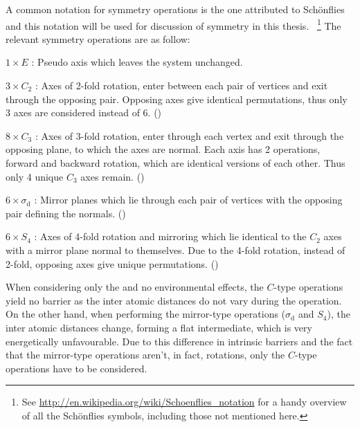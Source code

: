 A common notation for symmetry operations is the one attributed to Sch\"onflies~\cite{schonflies-notation-1889} and this notation will be used for discussion of symmetry in this thesis.
~\footnote{See \url{http://en.wikipedia.org/wiki/Schoenflies_notation} for a handy overview of all the Sch\"onflies symbols, including those not mentioned here.}
The relevant symmetry operations are as follow:
\bit
\item $1 \times E$ : Pseudo axis which leaves the system unchanged.
\item $3 \times C_2$ : Axes of 2-fold rotation, enter between each pair of vertices and exit through the opposing pair.
Opposing axes give identical permutations, thus only 3 axes are considered instead of 6.
()
\item $8 \times C_3$ : Axes of 3-fold rotation, enter through each vertex and exit through the opposing plane, to which the axes are normal. Each axis has 2 operations, forward and backward rotation, which are identical versions of each other.
Thus only 4 unique $C_3$ axes remain.
()
\item $6 \times \sigma_\text{d}$ : Mirror planes which lie through each pair of vertices with the opposing pair defining the normals.
()
\item $6 \times S_4$ : Axes of 4-fold rotation and mirroring which lie identical to the $C_2$ axes with a mirror plane normal to themselves. Due to the 4-fold rotation, instead of 2-fold, opposing axes give unique permutations.
()
\eit

When considering only the  and no environmental effects, the $C$-type operations yield no barrier as the inter atomic distances do not vary during the operation.
On the other hand, when performing the mirror-type operations ($\sigma_\text{d}$ and $S_4$), the inter atomic distances change, forming a flat  intermediate, which is very energetically unfavourable.
Due to this difference in intrinsic barriers and the fact that the mirror-type operations aren't, in fact, rotations, only the $C$-type operations have to be considered.


